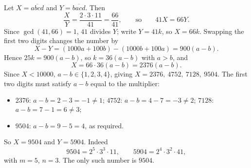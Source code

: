 Let $X=\overline{abcd}$ and $Y=\overline{bacd}$. Then
\[\dfrac XY=\dfrac{2\cdot3\cdot11}{41}=\dfrac{66}{41},\qquad\text{so}\qquad 41X=66Y.\]
Since $\gcd(41,66)=1$, $41$ divides $Y$; write $Y=41k$, so $X=66k$. Swapping the first two digits changes the number by
\[X-Y=(1000a+100b)-(1000b+100a)=900(a-b).\]
Hence $25k=900(a-b)$, so $k=36(a-b)$ with $a>b$, and
\[X=66\cdot36(a-b)=2376(a-b).\]
Since $X<10000$, $a-b\in\{1,2,3,4\}$, giving $X=2376,\ 4752,\ 7128,\ 9504$. The first two digits must satisfy $a-b$ equal to the multiplier:
\begin{itemize}
\item $2376$: $a-b=2-3=-1\ne1$; \quad $4752$: $a-b=4-7=-3\ne2$; \quad $7128$: $a-b=7-1=6\ne3$;
\item $9504$: $a-b=9-5=4$, as required.
\end{itemize}
So $X=9504$ and $Y=5904$. Indeed
\[9504=2^5\cdot3^3\cdot11,\qquad5904=2^4\cdot3^2\cdot41,\]
with $m=5$, $n=3$. The only such number is $\boxed{9504}$.
